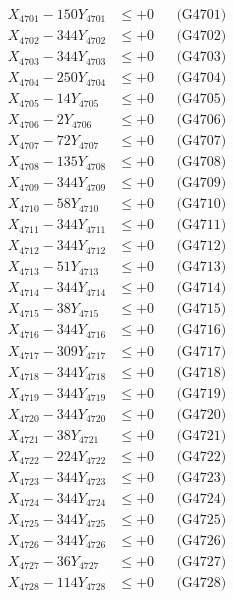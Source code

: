\documentclass[a4paper,10pt]{article}
\begin{document}
{\begin{align}
\allowbreak
X_{4701} - 150Y_{4701} &\leq +0 && \text{(G4701)} \\
X_{4702} - 344Y_{4702} &\leq +0 && \text{(G4702)} \\
X_{4703} - 344Y_{4703} &\leq +0 && \text{(G4703)} \\
X_{4704} - 250Y_{4704} &\leq +0 && \text{(G4704)} \\
X_{4705} - 14Y_{4705} &\leq +0 && \text{(G4705)} \\
X_{4706} - 2Y_{4706} &\leq +0 && \text{(G4706)} \\
X_{4707} - 72Y_{4707} &\leq +0 && \text{(G4707)} \\
X_{4708} - 135Y_{4708} &\leq +0 && \text{(G4708)} \\
X_{4709} - 344Y_{4709} &\leq +0 && \text{(G4709)} \\
X_{4710} - 58Y_{4710} &\leq +0 && \text{(G4710)} \\
\allowbreak
X_{4711} - 344Y_{4711} &\leq +0 && \text{(G4711)} \\
X_{4712} - 344Y_{4712} &\leq +0 && \text{(G4712)} \\
X_{4713} - 51Y_{4713} &\leq +0 && \text{(G4713)} \\
X_{4714} - 344Y_{4714} &\leq +0 && \text{(G4714)} \\
X_{4715} - 38Y_{4715} &\leq +0 && \text{(G4715)} \\
X_{4716} - 344Y_{4716} &\leq +0 && \text{(G4716)} \\
X_{4717} - 309Y_{4717} &\leq +0 && \text{(G4717)} \\
X_{4718} - 344Y_{4718} &\leq +0 && \text{(G4718)} \\
X_{4719} - 344Y_{4719} &\leq +0 && \text{(G4719)} \\
X_{4720} - 344Y_{4720} &\leq +0 && \text{(G4720)} \\
\allowbreak
X_{4721} - 38Y_{4721} &\leq +0 && \text{(G4721)} \\
X_{4722} - 224Y_{4722} &\leq +0 && \text{(G4722)} \\
X_{4723} - 344Y_{4723} &\leq +0 && \text{(G4723)} \\
X_{4724} - 344Y_{4724} &\leq +0 && \text{(G4724)} \\
X_{4725} - 344Y_{4725} &\leq +0 && \text{(G4725)} \\
X_{4726} - 344Y_{4726} &\leq +0 && \text{(G4726)} \\
X_{4727} - 36Y_{4727} &\leq +0 && \text{(G4727)} \\
X_{4728} - 114Y_{4728} &\leq +0 && \text{(G4728)} \\

\end{align}}
\end{document}
